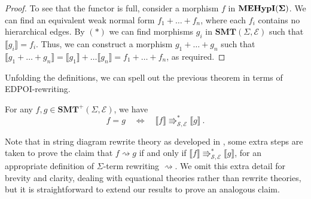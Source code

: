 \begin{proof}
To see that the functor is full,  consider a morphism $f$ in ${\mathbf{MEHypI(\Sigma)}}$.  We can find an equivalent weak normal form $f_1 + \ldots + f_n$,  where each $f_i$ contains no hierarchical edges.  By $(*)$ we can find morphisms $g_i$ in $\textbf{SMT}(\Sigma, \mathcal E)$ such that $\llbracket g_i \rrbracket = f_i$.  Thus,  we can construct a morphism $g_1 + \ldots + g_n$ such that $\llbracket g_1 + \ldots + g_n \rrbracket = \llbracket g_1 \rrbracket + \ldots \llbracket g_n \rrbracket = f_1 + \ldots + f_n$,  as required. 
\end{proof}

Unfolding the definitions,  we can spell out the previous theorem in terms of EDPOI-rewriting. 
\begin{corollary}
For any $f, g \in \textbf{SMT}^{+}(\Sigma, \mathcal{E})$,  we have
\[
	f = g \quad \iff \quad \llbracket f \rrbracket \Rrightarrow^{*}_{\mathcal{S}, \mathcal{E}} \llbracket g \rrbracket~ . 
\]
 \end{corollary}
%
%
%
%
Note that in string diagram rewrite theory as developed in \cite{bonchi_string_2022-2},  some extra steps are taken to prove the claim that $f \rightsquigarrow g$ if and only if $\llbracket f \rrbracket \Rrightarrow^{*}_{\mathcal{S}, \mathcal{E}} \llbracket g \rrbracket$,  for an appropriate definition of $\Sigma$-term rewriting $\rightsquigarrow$.  We omit this extra detail for brevity and clarity,  dealing with equational theories rather than rewrite theories,  but it is straightforward to extend our results to prove an analogous claim.  
